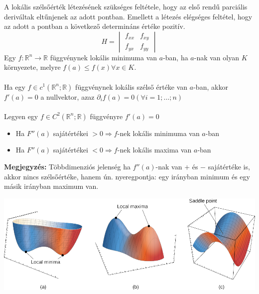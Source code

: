 \documentclass[11pt,a4paper]{article}
\begin{document}
\begin{tcolorbox}[colback=blue!5!white,colframe=blue!70!black,title= 7. Szélsőérték{,} feltételes szélsőérték]
    A lokális szélsőérték létezésének szükséges feltétele, hogy az első rendű parciális deriváltak eltűnjenek az adott
    pontban. Emellett a létezés elégséges feltétel, hogy az adott a pontban a következő determináns értéke pozitív.
    $$H = \begin{vmatrix}
        f_{xx} & f_{xy} \\ 
        f_{yx} & f_{yy}
        \end{vmatrix}$$
        Egy \(f : \mathbb{R}^n \to \mathbb{R}\) függvénynek lokális minimuma van \(a\)-ban, ha \(a\)-nak van olyan \(K\) környezete, melyre \(f(a) \leq f(x)\forall x \in K\).\\\\
        Ha egy \(f \in c^1(\mathbb{R}^n;\mathbb{R})\) függvénynek lokális szélső értéke van \(a\)-ban, akkor \(f'(a) = 0\) a nullvektor, azaz \(\partial_i f(a) = 0(\forall i =
        1;\dots ; n)\)\\\\
        Legyen egy \(f \in C^2(\mathbb{R}^n;\mathbb{R})\) függvényre \(f'(a) = 0\)\\
        \begin{itemize}
            \item Ha \(F''(a)\) sajátértékei \(>0 \Rightarrow f\)-nek lokális minimuma van \(a\)-ban
            \item Ha \(F''(a)\) sajátértékei \(<0 \Rightarrow f\)-nek lokális maxima van \(a\)-ban
        \end{itemize}
        \textbf{Megjegyzés:} Többdimenziós jelenség ha \(f''(a)\)-nak van \(+\) és \(-\) sajátértéke is, akkor nincs szélsőértéke, hanem ún. nyeregpontja:
egy irányban minimum és egy másik irányban maximum van.

\begin{center}
    \includegraphics[scale = 0.8]{saddle_point.png}\\
\end{center}
\end{tcolorbox}
\end{document}
